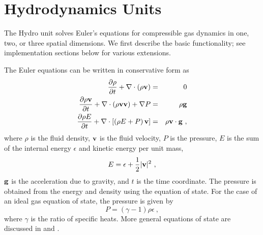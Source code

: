 \chapter{Hydrodynamics Units}
\label{Chp:Hydrodynamics Unit}

The \unit{Hydro} unit solves Euler's equations for compressible gas dynamics
in one, two, or three spatial dimensions.  
We first describe the basic functionality; see implementation sections
below for various extensions.

The Euler equations can be
written
in conservative form as
\begin{eqnarray}
{{\partial \rho} \over {\partial t}}
 + {\bf \nabla} \cdot \left ( \rho {\bf v} \right ) & = & 0\\
{\partial \rho {\bf v} \over \partial t} +
 {\bf \nabla}  \cdot \left ( \rho {\bf v} {\bf v} \right ) +
 {\bf \nabla}  P
 & = & \rho {\bf g}\\
{\partial \rho E \over \partial t} +
 {\bf \nabla} \cdot \left [ \left ( \rho E + P \right ) {\bf v}
 \right ] & = &
 \rho {\bf v} \cdot {\bf g}\ ,
\end{eqnarray}
where $\rho$ is the fluid density, ${\bf v}$ is the fluid
velocity, $P$ is the pressure, $E$ is the
sum of the internal energy $\epsilon$ and kinetic energy per unit mass,
\begin{equation}
E = \epsilon + {1 \over 2} |{\bf v}|^2\ ,
\end{equation}
${\bf g}$ is the acceleration due to gravity,
and $t$ is the time coordinate.
The pressure is obtained from the energy and
density using the equation of state.
For the case of an ideal gas equation of state, the pressure is
given by
\begin{equation}
P = (\gamma - 1) \rho \epsilon\ ,
\end{equation}
where $\gamma$ is the ratio of specific heats.  More general
equations of state are discussed in  and .

